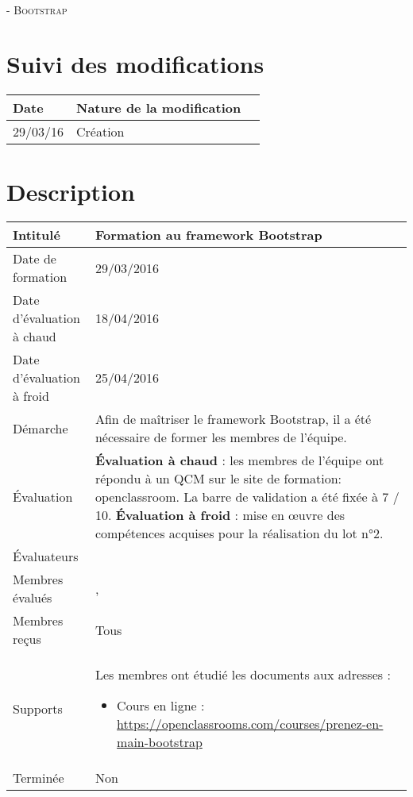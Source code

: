 \documentclass[asi, sansVersion]{picInsa}
\begin{document}
	\begin{center}
		\LARGE
		\textsc{
			\FF{}\\
			 - Bootstrap
		}
	\end{center}
	\vspace{0.5cm}

	\section*{Suivi des modifications}
		\begin{table}[H]
			\centering
			\begin{tabularx}{18cm}{|p{1.7cm}|X|p{4cm}|}
				\hline
				\rowcolor[gray]{0.90} Date & Nature de la modification \\
				\hline
				
				29/03/16 & Création \\
				\hline
			\end{tabularx}
		\end{table}

	\section*{Description}
		\begin{longtable}{|p{}|p{}|}
			\hline
			\cellcolor{gris2} Intitulé & Formation au framework Bootstrap\\\hline
			\cellcolor{gris2} Date de formation & 29/03/2016\\\hline
			\cellcolor{gris2} Date d'évaluation à chaud & 18/04/2016 \\\hline
			\cellcolor{gris2} Date d'évaluation à froid & 25/04/2016\\\hline
			\cellcolor{gris2} Démarche & Afin de maîtriser le framework Bootstrap, il a été nécessaire de former les membres de l'équipe.\\\hline
			\cellcolor{gris2} Évaluation &
				\textbf{Évaluation à chaud} : les membres de l'équipe ont répondu à un QCM sur le site de formation: openclassroom. La barre de validation a été fixée à 7 / 10.\newline
				\textbf{Évaluation à froid} : mise en œuvre des compétences acquises pour la réalisation du lot n°2.\\\hline
			\cellcolor{gris2} Évaluateurs & \Matthieu{}\\\hline
			\cellcolor{gris2} Membres évalués & \Mathieu{}, \Julie{}\\\hline
			\cellcolor{gris2} Membres reçus & Tous \\\hline
			\cellcolor{gris2} Supports & Les membres ont étudié les documents aux adresses : \begin{itemize}
			\item Cours en ligne : \url{https://openclassrooms.com/courses/prenez-en-main-bootstrap}
		\end{itemize}
			 \\\hline
			\cellcolor{gris2} Terminée & Non \\\hline
		\end{longtable}
\end{document}

